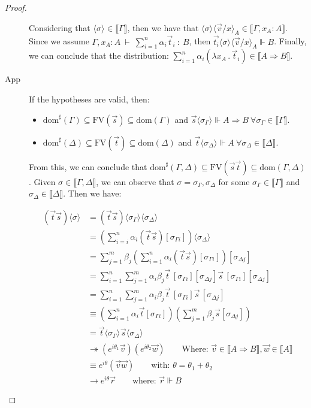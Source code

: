 \documentclass[runningheads,orivec]{llncs}
\newcommand\ansubst[2]{\ensuremath{\langle #1 \rangle_{#2}}}
\newcommand\dom[1]{\mathrm{dom}(#1)}
\newcommand\sdom[1]{\mathrm{dom}^{\sharp}(#1)}
\newcommand\FV[1]{\mathrm{FV}(#1)}
\def\Lam#1#2#3{\lambda#1_{#2}\,{.}\,#3} %
\def\evalone{\rightarrow}
\def\eval{\twoheadrightarrow}
\def\Arr{\Rightarrow}
\def\sem#1{\llbracket#1\rrbracket}
\def\TYP#1#2#3{#1~{\vdash}~#2~{:}~#3}
\def\real{\Vdash}
\begin{document}
\begin{proof}
\begin{description}
    Considering that $\ansubst{\sigma}{}\in\sem{\Gamma}$, then we have that $\ansubst{\sigma}{}\ansubst{\vec v/x}{A}\in\sem{\Gamma,x_A:A}$. Since we assume $\TYP{\Gamma, x_A:A}{\sum_{i=1}^{n}\alpha_i\vec t_i}{B}$, then $\vec{t_i}\ansubst{\sigma}{}\ansubst{\vec v/x}{A}\real B$. Finally, we can conclude that the distribution: $\sum_{i=1}^{n}\alpha_i (\Lam{x}{A}{\vec t_i})\in\sem{A\Arr B}$.

    \item[App] If the hypotheses are valid, then:
    \begin{itemize}
        \item $\sdom{\Gamma}\subseteq \FV{\vec s}\subseteq \dom{\Gamma}$ and $\vec s \ansubst{\sigma_\Gamma}{}\Vdash A\Arr B\ \forall \sigma_\Gamma\in\sem{\Gamma}$.
        \item $\sdom{\Delta}\subseteq \FV{\vec t}\subseteq \dom{\Delta}$ and $\vec t\ansubst{\sigma_\Delta}{}\Vdash A\ \forall\sigma_\Delta\in\sem{\Delta}$.
    \end{itemize}
    
    From this, we can conclude that $\sdom{\Gamma,\Delta}\subseteq \FV{\vec s \vec t}\subseteq \dom{\Gamma,\Delta}$. Given $\sigma\in\sem{\Gamma,\Delta}$, we can observe that $\sigma=\sigma_\Gamma,\sigma_\Delta$ for some $\sigma_\Gamma\in\sem{\Gamma}$ and $\sigma_\Delta\in\sem{\Delta}$. Then we have:
    
    \begin{align*}
        (\vec{t}\vec{s})\ansubst{\sigma}{} &= (\vec{t}\vec{s})\ansubst{\sigma_\Gamma}{}\ansubst{\sigma_\Delta}{}\\
        &=(\sum_{i=i}^{n}\alpha_i (\vec{t}\vec{s})[\sigma_{\Gamma i}])\ansubst{\sigma_\Delta}{}\\
        &=\sum_{j=1}^{m} \beta_j (\sum_{i=1}^{n} \alpha_i (\vec{t} \vec{s})[\sigma_{\Gamma i}])[\sigma_{\Delta j}]\\
        &=\sum_{i=1}^{n}\sum_{j=1}^{m} \alpha_i \beta_j \vec{t}\,[\sigma_{\Gamma i}][\sigma_{\Delta j}] \vec{s}\,[\sigma_{\Gamma i}][\sigma_{\Delta j}]\\
        &=\sum_{i=1}^{n}\sum_{j=1}^{m} \alpha_i \beta_j \vec{t}\,[\sigma_{\Gamma i}]\vec{s}\,[\sigma_{\Delta j}]\\
        &\equiv (\sum_{i=1}^{n}\alpha_i\vec{t}[\sigma_{\Gamma i}])(\sum_{j=1}^{m} \beta_j \vec{s}[\sigma_{\Delta j}])\\
        &=\vec{t}\ansubst{\sigma_\Gamma}{} \vec{s}\ansubst{\sigma_\Delta}{}\\
        &\eval (e^{i\theta_{1}} \vec{v}) (e^{i\theta_{2}} \vec{w})\qquad\text{Where: } \vec{v}\in\sem{A\Arr B}, \vec{w}\in\sem{A}\\
        &\equiv e^{i\theta} (\vec{v} \vec{w})\qquad\text{with: }\theta=\theta_1 + \theta_2\\
        &\evalone e^{i\theta}\vec r\qquad\text{where: } \vec{r}\real B
    \end{align*}
    

\end{description}
\end{proof}
\end{document}
